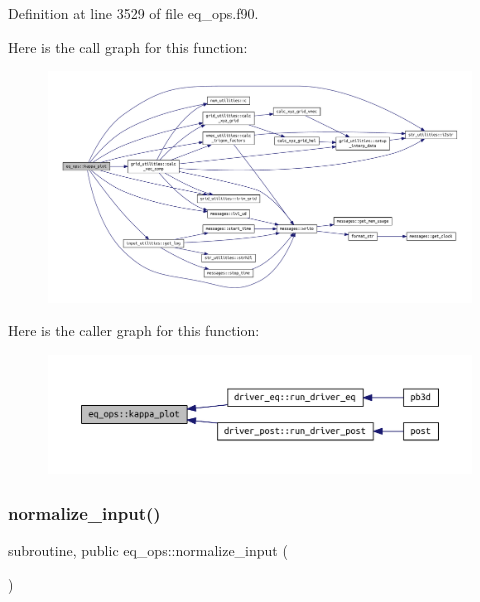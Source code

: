 Definition at line 3529 of file eq\+\_\+ops.\+f90.

Here is the call graph for this function\+:
\nopagebreak
\begin{figure}[H]
\begin{center}
\leavevmode
\includegraphics[width=350pt]{namespaceeq__ops_a9ecb744b3812fe838f13c9886307da24_cgraph}
\end{center}
\end{figure}
Here is the caller graph for this function\+:
\nopagebreak
\begin{figure}[H]
\begin{center}
\leavevmode
\includegraphics[width=350pt]{namespaceeq__ops_a9ecb744b3812fe838f13c9886307da24_icgraph}
\end{center}
\end{figure}
\mbox{\label{namespaceeq__ops_a1b4c764da73624722d7e76498a2b80a9}} 
\subsubsection{\texorpdfstring{normalize\+\_\+input()}{normalize\_input()}}
{\footnotesize\ttfamily subroutine, public eq\+\_\+ops\+::normalize\+\_\+input (\begin{DoxyParamCaption}{ }\end{DoxyParamCaption})}



